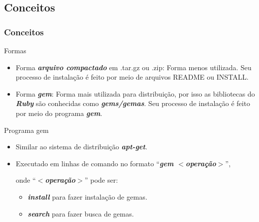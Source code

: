 \subsection{Conceitos}
\begin{frame}
 \frametitle{Conceitos}

  \begin{block}{Formas}

   \begin{itemize}

    \item Forma \emph{\textbf{arquivo compactado}} em .tar.gz ou .zip: Forma menos utilizada. Seu processo
    de instalação é feito por meio de arquivos README ou INSTALL.   
   
    \item Forma \emph{\textbf{gem}}: Forma mais utilizada para distribuição, por isso as bibliotecas do
    \emph{\textbf{Ruby}} são conhecidas como \emph{\textbf{gems/gemas}}. Seu processo de instalação
    é feito por meio do programa \emph{\textbf{gem}}.

   \end{itemize}

  \end{block}

  \begin{block}{Programa gem}

   \begin{itemize}

    \item Similar ao sistema de distribuição \emph{\textbf{apt-get}}.

    \item Executado em linhas de comando no formato ``\emph{\textbf{gem $<$operação$>$}}'',

    onde ``\emph{\textbf{$<$operação$>$}}'' pode ser:

    \begin{itemize}

     \item \emph{\textbf{install}} para fazer instalação de gemas.

     \item \emph{\textbf{search}} para fazer busca de gemas.

    \end{itemize}


   \end{itemize}

  \end{block}

\end{frame}


